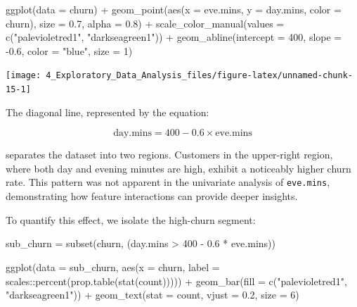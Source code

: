 \documentclass[
  11pt,
]{book}
\makeatletter
\newenvironment{Shaded}{}{}
\newcommand{\AttributeTok}[1]{#1}
\newcommand{\DecValTok}[1]{#1}
\newcommand{\FloatTok}[1]{#1}
\newcommand{\FunctionTok}[1]{#1}
\newcommand{\NormalTok}[1]{#1}
\newcommand{\OtherTok}[1]{\textcolor[rgb]{0.39,0.39,0.39}{#1}}
\newcommand{\SpecialCharTok}[1]{\textcolor[rgb]{0.39,0.39,0.39}{#1}}
\newcommand{\StringTok}[1]{\textcolor[rgb]{0.39,0.39,0.39}{#1}}
\newenvironment{kframe}{%
\medskip{}
\setlength{\fboxsep}{.8em}
 \def\at@end@of@kframe{}%
 \ifinner\ifhmode%
  \def\at@end@of@kframe{\end{minipage}}%
  \begin{minipage}{\columnwidth}%
 \fi\fi%
 \def\FrameCommand##1{\hskip\@totalleftmargin \hskip-\fboxsep
 \colorbox{shadecolor}{##1}\hskip-\fboxsep
     \hskip-\linewidth \hskip-\@totalleftmargin \hskip\columnwidth}%
 \MakeFramed {\advance\hsize-\width
   \@totalleftmargin\z@ \linewidth\hsize
   \@setminipage}}%
 {\par\unskip\endMakeFramed%
 \at@end@of@kframe}
\renewenvironment{Shaded}{\begin{kframe}}{\end{kframe}}
\theoremstyle{definition}
\theoremstyle{definition}
\theoremstyle{definition}
\theoremstyle{definition}
\theoremstyle{remark}
\makeatother
\begin{document}
\begin{Shaded}
\begin{Highlighting}[]
\FunctionTok{ggplot}\NormalTok{(}\AttributeTok{data =}\NormalTok{ churn) }\SpecialCharTok{+}
    \FunctionTok{geom\_point}\NormalTok{(}\FunctionTok{aes}\NormalTok{(}\AttributeTok{x =}\NormalTok{ eve.mins, }\AttributeTok{y =}\NormalTok{ day.mins, }\AttributeTok{color =}\NormalTok{ churn), }\AttributeTok{size =} \FloatTok{0.7}\NormalTok{, }\AttributeTok{alpha =} \FloatTok{0.8}\NormalTok{) }\SpecialCharTok{+}
    \FunctionTok{scale\_color\_manual}\NormalTok{(}\AttributeTok{values =} \FunctionTok{c}\NormalTok{(}\StringTok{"palevioletred1"}\NormalTok{, }\StringTok{"darkseagreen1"}\NormalTok{)) }\SpecialCharTok{+}
    \FunctionTok{geom\_abline}\NormalTok{(}\AttributeTok{intercept =} \DecValTok{400}\NormalTok{, }\AttributeTok{slope =} \SpecialCharTok{{-}}\FloatTok{0.6}\NormalTok{, }\AttributeTok{color =} \StringTok{"blue"}\NormalTok{, }\AttributeTok{size =} \DecValTok{1}\NormalTok{)}
\end{Highlighting}
\end{Shaded}

\begin{center}\texttt{[image: 4\_Exploratory\_Data\_Analysis\_files/figure-latex/unnamed-chunk-15-1]} \end{center}

The diagonal line, represented by the equation:

\[
\text{day.mins} = 400 - 0.6 \times \text{eve.mins}
\]

separates the dataset into two regions. Customers in the upper-right region, where both day and evening minutes are high, exhibit a noticeably higher churn rate. This pattern was not apparent in the univariate analysis of \texttt{eve.mins}, demonstrating how feature interactions can provide deeper insights.

To quantify this effect, we isolate the high-churn segment:

\begin{Shaded}
\begin{Highlighting}[]
\NormalTok{sub\_churn }\OtherTok{=} \FunctionTok{subset}\NormalTok{(churn, (day.mins }\SpecialCharTok{\textgreater{}} \DecValTok{400} \SpecialCharTok{{-}} \FloatTok{0.6} \SpecialCharTok{*}\NormalTok{ eve.mins))}

\FunctionTok{ggplot}\NormalTok{(}\AttributeTok{data =}\NormalTok{ sub\_churn, }\FunctionTok{aes}\NormalTok{(}\AttributeTok{x =}\NormalTok{ churn, }\AttributeTok{label =}\NormalTok{ scales}\SpecialCharTok{::}\FunctionTok{percent}\NormalTok{(}\FunctionTok{prop.table}\NormalTok{(}\FunctionTok{stat}\NormalTok{(count))))) }\SpecialCharTok{+}
    \FunctionTok{geom\_bar}\NormalTok{(}\AttributeTok{fill =} \FunctionTok{c}\NormalTok{(}\StringTok{"palevioletred1"}\NormalTok{, }\StringTok{"darkseagreen1"}\NormalTok{)) }\SpecialCharTok{+} 
    \FunctionTok{geom\_text}\NormalTok{(}\AttributeTok{stat =} \StringTok{\textquotesingle{}count\textquotesingle{}}\NormalTok{, }\AttributeTok{vjust =} \FloatTok{0.2}\NormalTok{, }\AttributeTok{size =} \DecValTok{6}\NormalTok{)}
\end{Highlighting}
\end{Shaded}
\end{document}
